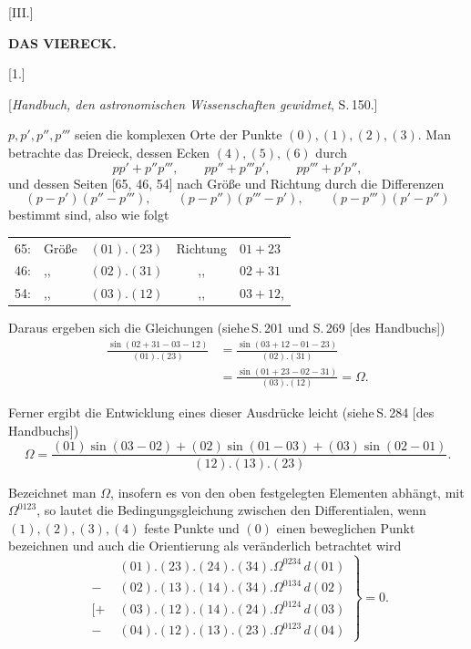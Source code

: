 
\begin{center}
[III.]

\textbf{DAS VIERECK.}

[1.]

[\emph{Handbuch, den astronomischen Wissenschaften gewidmet}, S.\,150.]
\end{center}

$p, p', p'', p'''$ seien die komplexen Orte der Punkte $(0), (1), (2), (3)$. Man betrachte das Dreieck, dessen Ecken $(4), (5), (6)$ durch
\[
pp'+p''p''', \qquad pp''+p'''p', \qquad pp'''+p'p'',
\]
und dessen Seiten [65, 46, 54] nach Größe und Richtung durch die Differenzen
\[
(p-p')(p''-p'''), \qquad (p-p'')(p'''-p'), \qquad (p-p''')(p'-p'')
\]
bestimmt sind, also wie folgt

\begin{center}
\begin{tabular}{rllcl}
65: & Größe & $(01).(23)$ & Richtung & $01+23$\\
46: & ,, & $(02).(31)$ & ,, & $02+31$\\
54: & ,, & $(03).(12)$ & ,, & $03+12$,
\end{tabular}
\end{center}

Daraus ergeben sich die Gleichungen (siehe\,S.\,201 und S.\,269 [des Handbuchs])
\[
\begin{aligned}
\frac{\sin(02+31-03-12)}{(01).(23)} &= \frac{\sin(03+12-01-23)}{(02).(31)}\\
&= \frac{\sin(01+23-02-31)}{(03).(12)} = \Omega.
\end{aligned}
\]

Ferner ergibt die Entwicklung eines dieser Ausdrücke leicht (siehe\,S.\,284 [des Handbuchs])
\[
\Omega = \frac{(01)\sin(03-02)+(02)\sin(01-03)+(03)\sin(02-01)}{(12).(13).(23)}.
\]

Bezeichnet man $\Omega$, insofern es von den oben festgelegten Elementen abhängt, mit $\Omega^{0123}$, so lautet die Bedingungsgleichung zwischen den Differentialen, wenn $(1), (2), (3), (4)$ feste Punkte und $(0)$ einen beweglichen Punkt bezeichnen und auch die Orientierung als veränderlich betrachtet wird
\[
\left.
\begin{aligned}
&(01).(23).(24).(34).\Omega^{0234}\,d(01)\\
-\;&(02).(13).(14).(34).\Omega^{0134}\,d(02)\\
[+\;&(03).(12).(14).(24).\Omega^{0124}\,d(03)\\
-\;&(04).(12).(13).(23).\Omega^{0123}\,d(04)
\end{aligned}
\right\} = 0.
\]
